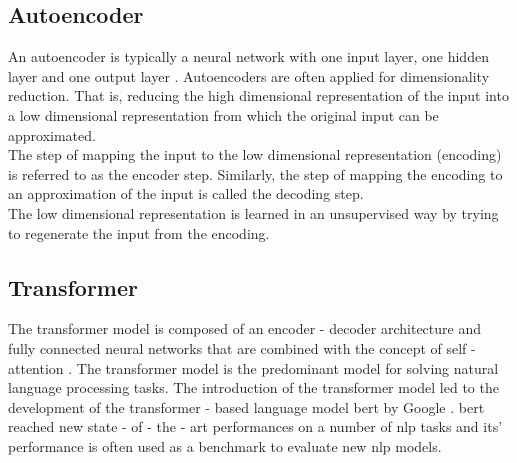 \subsection{Autoencoder}
\label{chap:autoencoder}
An autoencoder is typically a neural network with one input layer, one hidden layer and one output layer \cite{bank2021autoencoders}.
Autoencoders are often applied for dimensionality reduction. That is, reducing the high dimensional representation of the input into a low dimensional representation from which the original input can be approximated.\\
The step of mapping the input to the low dimensional representation (encoding) is referred to as the encoder step. Similarly, the step of mapping the encoding to an approximation of the input is called the decoding step.\\
The low dimensional representation is learned in an unsupervised way by trying to regenerate the input from the encoding.

\subsection{Transformer}
The transformer model is composed of an encoder - decoder architecture and fully connected neural networks that are combined with the concept of self - attention \cite{vaswani2017attention}. The transformer model is the predominant model for solving natural language processing tasks. The introduction of the transformer model led to the development of the transformer - based language model \acrfull{bert} by Google \cite{devlin2018bert}. \acrshort{bert} reached new state - of - the - art performances on a number of \acrfull{nlp} tasks and its' performance is often used as a benchmark to evaluate new \acrshort{nlp} models.

